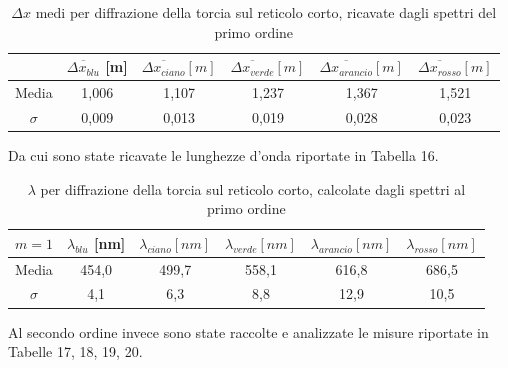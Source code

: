 \documentclass{article}
\begin{document}
\begin{table}[h]
    \centering
\begin{tabular}{||c|c|c|c|c|c||}
    \hline
     & \cellcolor{blue}$\overline{\Delta x_{blu}}$ [m] & \cellcolor{cyan}$\overline{\Delta x_{ciano}} [m]$ & \cellcolor{green}$\overline{\Delta x_{verde}}[m]$ & \cellcolor{orange}$\overline{\Delta x_{arancio}}[m]$ & \cellcolor{red}$\overline{\Delta x_{rosso}}[m]$ \\
    \hline
    Media & 1,006 & 1,107 & 1,237 & 1,367 & 1,521 \\
    $\sigma$ & 0,009 & 0,013 & 0,019 & 0,028 & 0,023 \\
    \hline
\end{tabular}
\caption{$\Delta x$ medi per diffrazione della torcia sul reticolo corto, ricavate dagli spettri del primo ordine}
\end{table}
\pagebreak
Da cui sono state ricavate le lunghezze d'onda riportate in Tabella 16.

\begin{table}[h]
    \centering
\begin{tabular}{||c|c|c|c|c|c||}
    \hline
     $m = 1$ & \cellcolor{blue}$\lambda_{blu}$ [nm] & \cellcolor{cyan}$\lambda_{ciano} [nm]$ & \cellcolor{green}$\lambda_{verde}[nm]$ & \cellcolor{orange}$\lambda_{arancio}[nm]$ & \cellcolor{red}$\lambda_{rosso}[nm]$ \\
    \hline
    Media & 454,0 & 499,7 & 558,1 & 616,8 & 686,5 \\
    $\sigma$ & 4,1 & 6,3 & 8,8 & 12,9 & 10,5\\
    \hline
\end{tabular}
\caption{$\lambda$ per diffrazione della torcia sul reticolo corto, calcolate dagli spettri al primo ordine}
\end{table}


Al secondo ordine invece sono state raccolte e analizzate le misure riportate in Tabelle 17, 18, 19, 20.
\end{document}
